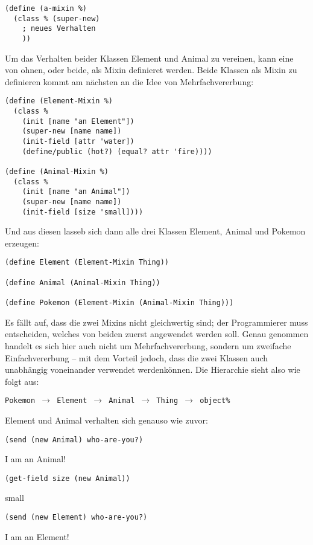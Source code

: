 \begin{lstlisting}
(define (a-mixin %)
  (class % (super-new)
    ; neues Verhalten
    ))
\end{lstlisting}

Um das Verhalten beider Klassen Element und Animal zu vereinen, kann eine von ohnen, oder beide, als Mixin definieret werden. Beide Klassen als Mixin zu definieren kommt am nächsten an die Idee von Mehrfachvererbung:

\begin{lstlisting}
(define (Element-Mixin %)
  (class % 
    (init [name "an Element"])
    (super-new [name name])
    (init-field [attr 'water])
    (define/public (hot?) (equal? attr 'fire))))

(define (Animal-Mixin %)
  (class %
    (init [name "an Animal"])
    (super-new [name name])
    (init-field [size 'small])))
\end{lstlisting}

Und aus diesen lasseb sich dann alle drei Klassen Element, Animal und Pokemon erzeugen:
\begin{lstlisting}
(define Element (Element-Mixin Thing))

(define Animal (Animal-Mixin Thing))
 
(define Pokemon (Element-Mixin (Animal-Mixin Thing)))
\end{lstlisting}

Es fällt auf, dass die zwei Mixins nicht gleichwertig sind; der Programmierer muss entscheiden, welches von beiden zuerst angewendet werden soll. Genau genommen handelt es sich hier auch nicht um Mehrfachvererbung, sondern um zweifache Einfachvererbung -- mit dem Vorteil jedoch, dass die zwei Klassen auch unabhängig voneinander verwendet werdenkönnen. Die Hierarchie sieht also wie folgt aus:

\texttt{Pokemon $\rightarrow$ Element $\rightarrow$ Animal $\rightarrow$ Thing $\rightarrow$ object\%}

Element und Animal verhalten sich genauso wie zuvor:

\begin{lstlisting}
(send (new Animal) who-are-you?)
\end{lstlisting}
{\routput {\qq}I am an Animal!\qq}

\begin{lstlisting}
(get-field size (new Animal))
\end{lstlisting}
{\rsymbol small}

\begin{lstlisting}
(send (new Element) who-are-you?)
\end{lstlisting}
{\routput {\qq}I am an Element!\qq}

